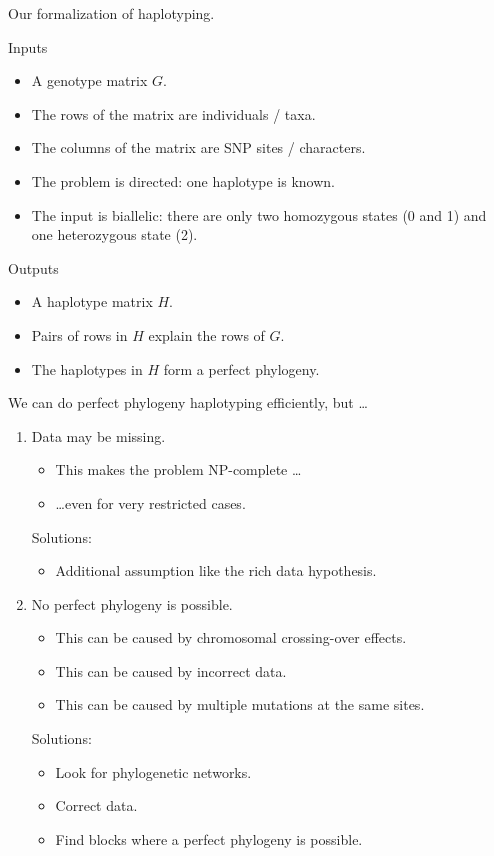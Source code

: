 \documentclass{beamer}
\begin{document}
\begin{frame}[t]{Our formalization of haplotyping.}
	\begin{block}{Inputs}
		\begin{itemize}
			\item A genotype matrix $G$.
			\item The rows of the matrix are individuals / taxa.
			\item The columns of the matrix are SNP sites / characters.
			\item<alert@1->
				The problem is directed: one haplotype is known.
			\item<alert@1->
				The input is biallelic: there are only two homozygous
				states (0 and 1) and one heterozygous state (2).
		\end{itemize}
	\end{block}
	\begin{block}{Outputs}
		\begin{itemize}
			\item A haplotype matrix $H$.
			\item Pairs of rows in $H$ explain the rows of $G$.
			\item<alert@1> The haplotypes in $H$ form a perfect phylogeny.
		\end{itemize}
	\end{block}
\end{frame}


\begin{frame}{We can do perfect phylogeny haplotyping efficiently, but
	\dots}
	\begin{enumerate}
		\item \alert{Data may be missing.}
			\begin{itemize}
				\item This makes the problem NP-complete \dots
				\item \dots even for very restricted cases.
			\end{itemize}
			\textcolor{green!50!black}{Solutions:}
			\begin{itemize}
				\item Additional assumption like the rich data hypothesis. 
			\end{itemize}
		\item \alert{No perfect phylogeny is possible.}
			\begin{itemize}
				\item This can be caused by chromosomal crossing-over effects.
				\item This can be caused by incorrect data.
				\item This can be caused by multiple mutations at the same sites.
			\end{itemize}
			\textcolor{green!50!black}{Solutions:}
			\begin{itemize}
				\item Look for phylogenetic networks.
				\item Correct data.
				\item<alert@1->
					Find blocks where a perfect phylogeny is possible.
			\end{itemize}
	\end{enumerate}
\end{frame}
\end{document}
